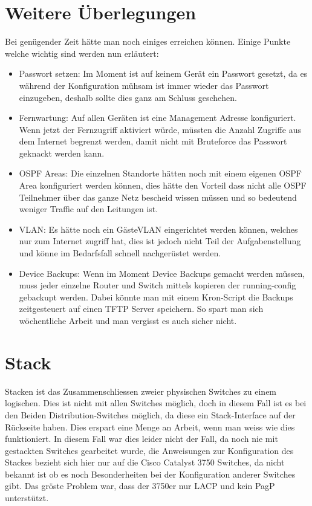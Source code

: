 \documentclass[11pt,a4paper]{scrreprt}
\begin{document}
\section{Weitere Überlegungen}

Bei genügender Zeit hätte man noch einiges erreichen können. Einige Punkte welche wichtig sind werden nun erläutert:
\begin{itemize}
\item Passwort setzen: Im Moment ist auf keinem Gerät ein Passwort gesetzt, da es während der Konfiguration mühsam ist immer wieder das Passwort einzugeben, deshalb sollte dies ganz am Schluss geschehen.
\item Fernwartung: Auf allen Geräten ist eine Management Adresse konfiguriert. Wenn jetzt der Fernzugriff aktiviert würde, müssten die Anzahl Zugriffe aus dem Internet begrenzt werden, damit nicht mit Bruteforce das Passwort geknackt werden kann.
\item OSPF Areas: Die einzelnen Standorte hätten noch mit einem eigenen OSPF Area konfiguriert werden können, dies hätte den Vorteil dass nicht alle OSPF Teilnehmer über das ganze Netz bescheid wissen müssen und so bedeutend weniger Traffic auf den Leitungen ist.
\item \acs{VLAN}: Es hätte noch ein Gäste\acs{VLAN} eingerichtet werden können, welches nur zum Internet zugriff hat, dies ist jedoch nicht Teil der Aufgabenstellung und könne im Bedarfsfall schnell nachgerüstet werden.
\item Device Backups: Wenn im Moment Device Backups gemacht werden müssen, muss jeder einzelne Router und Switch mittels kopieren der running-config gebackupt werden. Dabei könnte man mit einem Kron-Script die Backups zeitgesteuert auf einen TFTP Server speichern. So spart man sich wöchentliche Arbeit und man vergisst es auch sicher nicht.
\end{itemize}

\section{Stack}
Stacken ist das Zusammenschliessen zweier physischen Switches zu einem logischen. Dies ist nicht mit allen Switches möglich, doch in diesem Fall ist es bei den Beiden Distribution-Switches möglich, da diese ein Stack-Interface auf der Rückseite haben. Dies erspart eine Menge an Arbeit, wenn man weiss wie dies funktioniert. In diesem Fall war dies leider nicht der Fall, da noch nie mit gestackten Switches gearbeitet wurde, die Anweisungen zur Konfiguration des Stackes bezieht sich hier nur auf die Cisco Catalyst 3750 Switches, da nicht bekannt ist ob es noch Besonderheiten bei der Konfiguration anderer Switches gibt. Das gröste Problem war, dass der 3750er nur \acs{LACP} und kein \acs{PagP} unterstützt.
\end{document}
